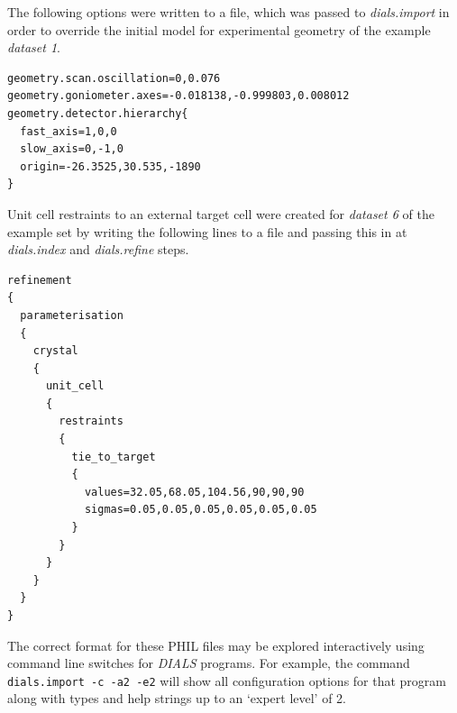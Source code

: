 \documentclass[preprint]{iucr}
\newcommand{\dials}{\emph{DIALS}\xspace}
\newcommand{\dialsimport}{\emph{dials.import}\xspace}
\newcommand{\dialsindex}{\emph{dials.index}\xspace}
\newcommand{\dialsrefine}{\emph{dials.refine}\xspace}
\begin{document}
The following options were written to a file, which was passed to \dialsimport
in order to override the initial model for experimental geometry of the example
\emph{dataset 1}.

\begin{verbatim}
geometry.scan.oscillation=0,0.076
geometry.goniometer.axes=-0.018138,-0.999803,0.008012
geometry.detector.hierarchy{
  fast_axis=1,0,0
  slow_axis=0,-1,0
  origin=-26.3525,30.535,-1890
}
\end{verbatim}

Unit cell restraints to an external target cell were created for
\emph{dataset 6} of
the example set by writing the following lines to a file and passing this in
at \dialsindex and \dialsrefine steps.

\begin{verbatim}
refinement
{
  parameterisation
  {
    crystal
    {
      unit_cell
      {
        restraints
        {
          tie_to_target
          {
            values=32.05,68.05,104.56,90,90,90
            sigmas=0.05,0.05,0.05,0.05,0.05,0.05
          }
        }
      }
    }
  }
}
\end{verbatim}

The correct format for these PHIL files may be explored interactively using
command line switches for \dials programs. For example, the command
\texttt{dials.import -c -a2 -e2} will show all configuration options
for that program along with
types and help strings up to an `expert level' of 2.
\end{document}
